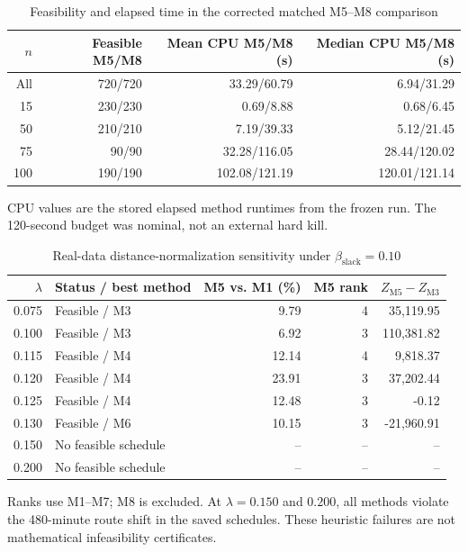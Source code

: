 \begin{table}[htbp]
\centering
\caption{Feasibility and elapsed time in the corrected matched M5--M8 comparison}
\label{tab:m5_alns_runtime_corrected}
\small
\begin{tabular}{rrrr}
\toprule
$n$ & Feasible M5/M8 & Mean CPU M5/M8 (s) & Median CPU M5/M8 (s) \\
\midrule
All & 720/720 & 33.29/60.79 & 6.94/31.29 \\
15 & 230/230 & 0.69/8.88 & 0.68/6.45 \\
50 & 210/210 & 7.19/39.33 & 5.12/21.45 \\
75 & 90/90 & 32.28/116.05 & 28.44/120.02 \\
100 & 190/190 & 102.08/121.19 & 120.01/121.14 \\
\bottomrule
\end{tabular}
\begin{flushleft}\footnotesize CPU values are the stored elapsed method runtimes from the frozen run. The 120-second budget was nominal, not an external hard kill.\end{flushleft}
\end{table}

\begin{table}[htbp]
\centering
\caption{Real-data distance-normalization sensitivity under $\beta_{\mathrm{slack}}=0.10$}
\label{tab:real_data_corrected}
\small
\begin{tabular}{r l r r r}
\toprule
$\lambda$ & Status / best method & M5 vs. M1 (\%) & M5 rank & $Z_{\mathrm{M5}}-Z_{\mathrm{M3}}$ \\
\midrule
0.075 & Feasible / M3 & 9.79 & 4 & 35,119.95 \\
0.100 & Feasible / M3 & 6.92 & 3 & 110,381.82 \\
0.115 & Feasible / M4 & 12.14 & 4 & 9,818.37 \\
0.120 & Feasible / M4 & 23.91 & 3 & 37,202.44 \\
0.125 & Feasible / M4 & 12.48 & 3 & -0.12 \\
0.130 & Feasible / M6 & 10.15 & 3 & -21,960.91 \\
0.150 & No feasible schedule & -- & -- & -- \\
0.200 & No feasible schedule & -- & -- & -- \\
\bottomrule
\end{tabular}
\begin{flushleft}\footnotesize Ranks use M1--M7; M8 is excluded. At $\lambda=0.150$ and $0.200$, all methods violate the 480-minute route shift in the saved schedules. These heuristic failures are not mathematical infeasibility certificates.\end{flushleft}
\end{table}
